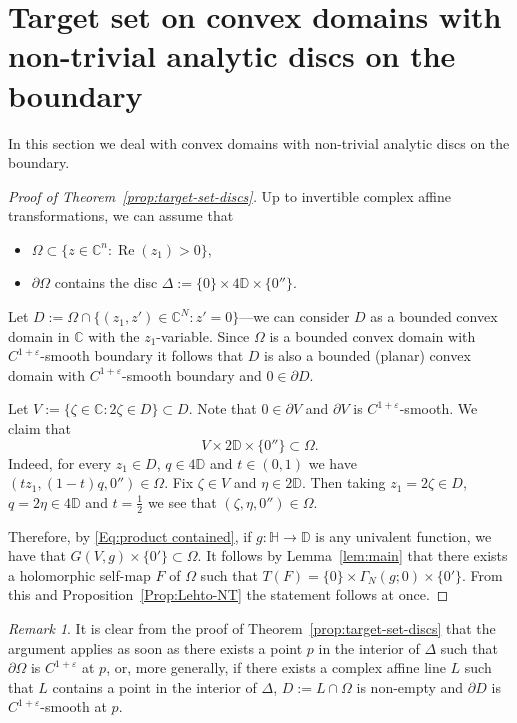 \documentclass[12pt]{amsart}
\theoremstyle{definition}
\theoremstyle{remark}
\newtheorem{remark}[theorem]{Remark}
\numberwithin{equation}{section}
\def\C{\mathbb C}
\def\D{\mathbb D}
\def\Ha{\mathbb H}
\renewcommand{\Re}{\operatorname{Re}}
\begin{document}
\section{Target set on convex domains with non-trivial analytic discs on the boundary}\label{Sec:4}

In this section we deal with convex domains with non-trivial analytic discs on the boundary.

 \begin{proof}[Proof of Theorem~\ref{prop:target-set-discs}]
Up to invertible complex affine transformations, we can assume that 
\begin{itemize}
\item[(i)] $\Omega\subset \{z\in\mathbb C^n:\Re (z_1)>0\}$,
\item[(ii)] $\partial\Omega$ contains the disc $\Delta:= \{0\}\times 4\D \times \{0''\}$.
\end{itemize}

Let $D:= \Omega \cap \{(z_1,z')\in \C^N: z'=0\}$---we can consider $D$ as a bounded convex domain in $\C$ with the $z_1$-variable. Since $\Omega$ is a bounded convex domain with $C^{1+\varepsilon}$-smooth boundary it follows that $D$ is also a bounded (planar) convex domain with $C^{1+\varepsilon}$-smooth  boundary and $0\in \partial D$. 

Let $V:=\{\zeta\in \C: 2\zeta\in D\}\subset D$. Note that $0\in \partial V$ and $\partial V$ is $C^{1+\varepsilon}$-smooth. We claim that 
\begin{equation}\label{Eq:product contained}
V\times 2\D\times \{0''\}\subset\Omega.
\end{equation}
Indeed, for every $z_1\in D$, $q\in 4\D$ and $t\in (0,1)$ we have $(tz_1,(1-t)q,0'')\in \Omega$. Fix $\zeta\in V$ and $\eta\in 2\D$. Then taking $z_1=2\zeta\in D$, $q=2\eta\in 4\D$ and $t=\frac{1}{2}$ we see that $(\zeta,\eta,0'')\in \Omega$.

Therefore, by \eqref{Eq:product contained}, if $g:\Ha \to \D$ is any univalent function, we have that {$G(V,g)\times\{0'\}\subset \Omega$}. It follows by Lemma~\ref{lem:main} that there exists a  holomorphic self-map $F$ of $\Omega$ such that 
 $T(F)=\{0\}\times \Gamma_N(g;0)\times \{0'\}$. From this {and Proposition~\ref{Prop:Lehto-NT}} the statement follows at once.
 \end{proof}

\begin{remark}
It is clear from the proof of {Theorem}~\ref{prop:target-set-discs} that the argument applies as soon as there exists a point $p$ in the interior of $\Delta$ such that $\partial\Omega$ is $C^{1+\varepsilon}$ at $p$, or, more generally, if there exists a complex affine line $L$ such that $L$ contains a point in the interior of $\Delta$, $D:=L\cap \Omega$ is non-empty and $\partial D$ is $C^{1+\varepsilon}$-smooth at $p$.
\end{remark}
\end{document}
